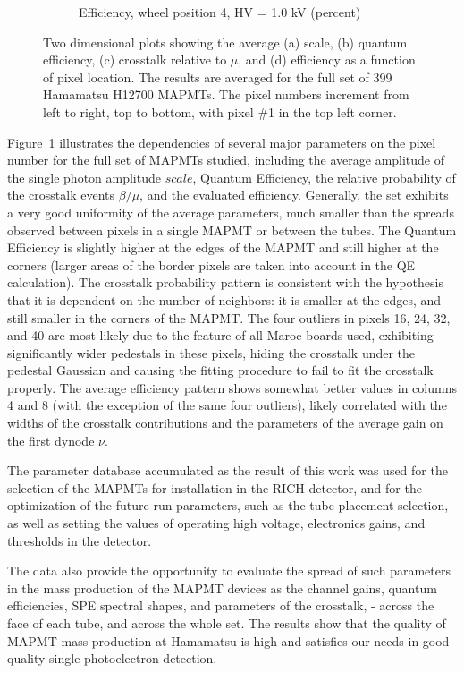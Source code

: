 \begin{figure}[t!]
\begin{subfigure}[c]{0.48\linewidth}
		\caption{Efficiency, wheel position 4, HV = 1.0 kV (percent)}
		\vspace{0mm}
	\end{subfigure}%
	\caption{Two dimensional plots showing the average (a) scale, (b) quantum efficiency, (c) crosstalk relative to $\mu$, and (d) efficiency as a function of pixel location. The results are averaged for the full set of 399 Hamamatsu H12700 MAPMTs. The pixel numbers increment from left to right, top to bottom, with pixel \#1 in the top left corner.}
	\label{fig:2d_avg_fit_results}
\end{figure}


Figure~\ref{fig:2d_avg_fit_results} illustrates the dependencies of several major parameters on the pixel number for the full set of MAPMTs studied, including the average amplitude of the single photon amplitude $scale$, Quantum Efficiency, the relative probability of the crosstalk events $\beta/\mu$, and the evaluated efficiency. Generally, the set exhibits a very good uniformity of the average parameters, much smaller than the spreads observed between pixels in a single MAPMT or between the tubes. The Quantum Efficiency is slightly higher at the edges of the MAPMT and still higher at the corners (larger areas of the border pixels are taken into account in the QE calculation). The crosstalk probability pattern is consistent with the hypothesis that it is dependent on the number of neighbors: it is smaller at the edges, and still smaller in the corners of the MAPMT. The four outliers in pixels 16, 24, 32, and 40 are most likely due to the feature of all Maroc boards used, exhibiting significantly wider pedestals in these pixels, hiding the crosstalk under the pedestal Gaussian and causing the fitting procedure to fail to fit the crosstalk properly. The average efficiency pattern shows somewhat better values in columns 4 and 8 (with the exception of the same four outliers), likely correlated with the widths of the crosstalk contributions and the parameters of the average gain on the first dynode $\nu$.    


The parameter database accumulated as the result of this work was used for the selection of the MAPMTs for installation in the RICH detector, and for the optimization of the future run parameters, such as the tube placement selection, as well as setting the values of operating high voltage, electronics gains, and thresholds in the detector.


The data also provide the opportunity to evaluate the spread of such parameters in the mass production of the MAPMT devices as the channel gains, quantum efficiencies, SPE spectral shapes, and parameters of the crosstalk, - across the face of each tube, and across the whole set. The results show that the quality of MAPMT mass production at Hamamatsu is high and satisfies our needs in good quality single photoelectron detection.



